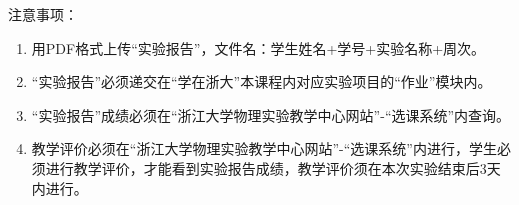 {\fangsong 注意事项：
\begin{enumerate}[label=\arabic*.]
    \item 用PDF格式上传“实验报告”，文件名：学生姓名+学号+实验名称+周次。
    \item “实验报告”必须递交在“学在浙大”本课程内对应实验项目的“作业”模块内。
    \item “实验报告”成绩必须在“浙江大学物理实验教学中心网站”-“选课系统”内查询。
    \item 教学评价必须在“浙江大学物理实验教学中心网站”-“选课系统”内进行，学生必须进行教学评价，才能看到实验报告成绩，教学评价须在本次实验结束后3天内进行。
\end{enumerate}}
\begin{center}
\end{center}